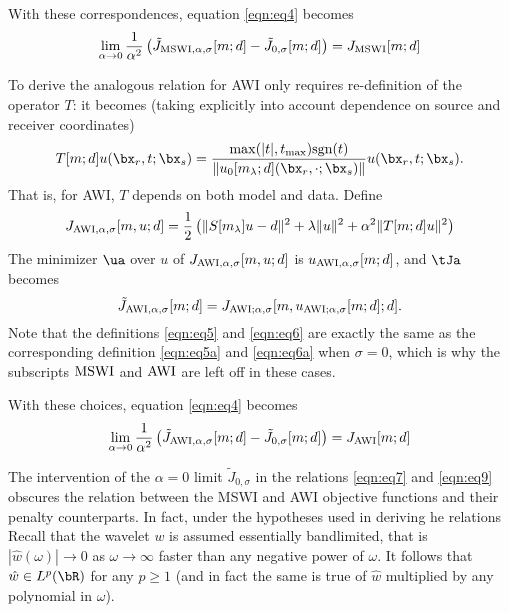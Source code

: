 With these correspondences, equation \ref{eqn:eq4} becomes
\begin{equation}
  \label{eqn:eq7}
  \lim_{\alpha \rightarrow 0}
  \frac{1}{\alpha^2}\left(\tilde{J}_{{\rm MSWI},\alpha,\sigma}[m;d]-\tilde{J}_{0,\sigma}[m;d]\right)=
  J_{\rm MSWI}[m;d]
\end{equation}

To derive the analogous relation for AWI only requires re-definition
of the operator $T$: it becomes (taking explicitly into account
dependence on source and receiver coordinates)
\begin{equation}
  \label{eqn:eq8}
  T[m;d] u(\bx_r,t;\bx_s) = \frac{\max(|t|, t_{\rm max})
    \mbox{sgn}(t)}{\|u_0[m_{\lambda};d](\bx_r,\cdot;\bx_s)\|}
  u(\bx_r,t;\bx_s).
\end{equation}
That is, for AWI, $T$ depends on both model and data. Define
\begin{equation}
  \label{eqn:eq5a}
   J_{{\rm AWI},\alpha,\sigma}[m,u;d] = \frac{1}{2}\left(\|S[m_{\lambda}]u-d\|^2 +
   \lambda\|u\|^2 + \alpha^2\|T[m;d]u\|^2\right)
 \end{equation}
The minimizer $\ua$ over $u$ of $ J_{{\rm AWI}, \alpha,\sigma}[m,u;d]$ is
$u_{{\rm AWI},\alpha,\sigma}[m;d]$, and $\tJa$ becomes
\begin{equation}
  \label{eqn:eq6a}
  \tilde{J}_{{\rm AWI},\alpha,\sigma}[m;d] =
  J_{{\rm AWI};\alpha,\sigma}[m,u_{{\rm AWI};\alpha,\sigma}[m;d];d].
\end{equation}
Note that the definitions \ref{eqn:eq5} and \ref{eqn:eq6} are exactly
the same as the corresponding definition \ref{eqn:eq5a} and
\ref{eqn:eq6a} when $\sigma=0$, which is why the subscripts ${\rm
  MSWI}$ and ${\rm AWI}$ are left off in these cases.

With these choices, equation \ref{eqn:eq4} becomes 
\begin{equation}
  \label{eqn:eq9}
  \lim_{\alpha \rightarrow 0}
  \frac{1}{\alpha^2}\left(\tilde{J}_{{\rm AWI},\alpha,\sigma}[m;d]-\tilde{J}_{0,\sigma}[m;d]\right)=
  J_{\rm AWI}[m;d]
\end{equation}

The intervention of the $\alpha=0$ limit $\tilde{J}_{0,\sigma}$ in the
relations \ref{eqn:eq7} and \ref{eqn:eq9} obscures the relation
between the MSWI and AWI objective functions and their penalty
counterparts. In fact, under the hypotheses used in deriving he
relations 
Recall that the wavelet $w$ is assumed essentially bandlimited, that is
$|\hat{w}(\omega)| \rightarrow 0$ as $\omega \rightarrow \infty$
faster than any negative power of $\omega$. It follows that $\hat{w}
\in L^p(\bR)$ for any $p \ge 1$ (and in fact the same is true of
$\hat{w}$ multiplied by any polynomial in $\omega$). 

